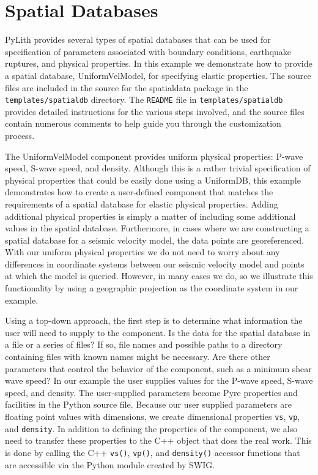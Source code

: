 \section{\label{sec:Extending:SpatialDatabases}Spatial Databases}

PyLith provides several types of spatial databases that can be used
for specification of parameters associated with boundary conditions,
earthquake ruptures, and physical properties. In this example we demonstrate
how to provide a spatial database, UniformVelModel, for specifying
elastic properties. The source files are included in the source for
the spatialdata package in the \texttt{templates/spatialdb} directory.
The \texttt{README} file in \texttt{templates/spatialdb} provides
detailed instructions for the various steps involved, and the source
files contain numerous comments to help guide you through the customization
process. 

The UniformVelModel component provides uniform physical properties:
P-wave speed, S-wave speed, and density. Although this is a rather
trivial specification of physical properties that could be easily
done using a UniformDB, this example demonstrates how to create a
user-defined component that matches the requirements of a spatial
database for elastic physical properties. Adding additional physical
properties is simply a matter of including some additional values
in the spatial database. Furthermore, in cases where we are constructing
a spatial database for a seismic velocity model, the data points are
georeferenced. With our uniform physical properties we do not need
to worry about any differences in coordinate systems between our seismic
velocity model and points at which the model is queried. However,
in many cases we do, so we illustrate this functionality by using
a geographic projection as the coordinate system in our example.

Using a top-down approach, the first step is to determine what information
the user will need to supply to the component. Is the data for the
spatial database in a file or a series of files? If so, file names
and possible paths to a directory containing files with known names
might be necessary. Are there other parameters that control the behavior
of the component, such as a minimum shear wave speed? In our example
the user supplies values for the P-wave speed, S-wave speed, and density.
The user-supplied parameters become Pyre properties and facilities
in the Python source file. Because our user supplied parameters are
floating point values with dimensions, we create dimensional properties
\texttt{vs}, \texttt{vp}, and \texttt{density}. In addition to defining
the properties of the component, we also need to transfer these properties
to the C++ object that does the real work. This is done by calling
the C++ \texttt{vs()}, \texttt{vp()}, and \texttt{density()} accessor
functions that are accessible via the Python module created by SWIG.

